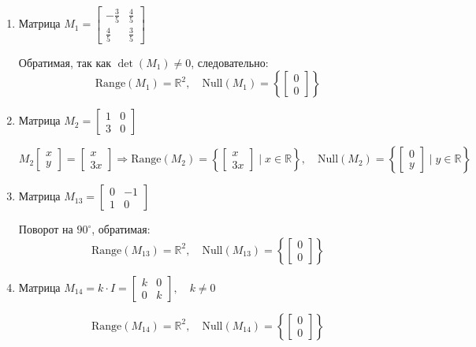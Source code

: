 \begin{enumerate}
  \item Матрица $M_1 = 
  \begin{bmatrix}
    -\frac{3}{5} & \frac{4}{5} \\
    \frac{4}{5} & \frac{3}{5}
  \end{bmatrix}$

  Обратимая, так как $\det(M_1) \ne 0$, следовательно:
  \[
    \text{Range}(M_1) = \mathbb{R}^2, \quad \text{Null}(M_1) = \left\{ \begin{bmatrix} 0 \\ 0 \end{bmatrix} \right\}
  \]

  \item Матрица $M_2 = 
  \begin{bmatrix}
    1 & 0 \\
    3 & 0
  \end{bmatrix}$

  \[
    M_2 \begin{bmatrix} x \\ y \end{bmatrix} =
    \begin{bmatrix} x \\ 3x \end{bmatrix}
  \Rightarrow
    \text{Range}(M_2) = 
    \left\{ \begin{bmatrix} x \\ 3x \end{bmatrix} \mid x \in \mathbb{R} \right\}, \quad
    \text{Null}(M_2) = 
    \left\{ \begin{bmatrix} 0 \\ y \end{bmatrix} \mid y \in \mathbb{R} \right\}
  \]

  \item Матрица $M_{13} = 
  \begin{bmatrix}
    0 & -1 \\
    1 & 0
  \end{bmatrix}$

  Поворот на $90^\circ$, обратимая:
  \[
    \text{Range}(M_{13}) = \mathbb{R}^2, \quad 
    \text{Null}(M_{13}) = \left\{ \begin{bmatrix} 0 \\ 0 \end{bmatrix} \right\}
  \]

  \item Матрица $M_{14} = k \cdot I = 
  \begin{bmatrix}
    k & 0 \\
    0 & k
  \end{bmatrix}, \quad k \ne 0$

  \[
    \text{Range}(M_{14}) = \mathbb{R}^2, \quad 
    \text{Null}(M_{14}) = \left\{ \begin{bmatrix} 0 \\ 0 \end{bmatrix} \right\}
  \]
\end{enumerate}


